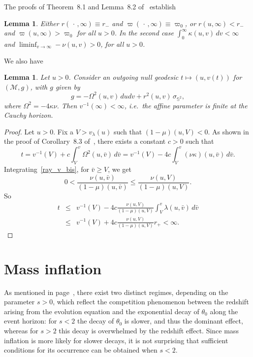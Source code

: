 \documentclass[a4paper,11pt,oneside,reqno]{amsart}
\newcommand{\s}{s}
\newtheorem{Lem}[Thm]{Lemma}
\newcommand{\cal}{\mathcal}
\begin{document}
The proofs of Theorem~8.1 and Lemma~8.2 of~\cite{relIst2} establish
\begin{Lem}\label{rmenos}
Either $r(\,\cdot\,,\infty)\equiv r_-$ and $\varpi(\,\cdot\,,\infty)\equiv \varpi_0$, or
$r(u,\infty)<r_-$ and $\varpi(u,\infty)>\varpi_0$ for all $u>0$. In the second
case $\int_0^\infty\kappa(u,v)\,dv<\infty$ and
$\liminf_{v\to\infty}-\nu(u,v)>0$, for all $u>0$.
\end{Lem}

We also have
\begin{Lem}\label{affine}
Let $u>0$. Consider an outgoing null geodesic $t\mapsto(u,v(t))$ for $({\cal M},g)$, with $g$ given by
$$
g=-\Omega^2(u,v)\,dudv+r^2(u,v)\,\sigma_{{\mathbb S}^2},
$$
where
$\Omega^2=-4\kappa\nu$.
Then $v^{-1}(\infty)<\infty$, i.e.\
the affine parameter is finite at the Cauchy horizon.
\end{Lem}
\begin{proof}
Let $u>0$. Fix a $V>v_\lambda(u)$ such that $(1-\mu)(u,V)<0$.
As shown in the proof of Corollary~8.3 of~\cite{relIst2}, there exists a constant $c>0$
such that
$$
t=v^{-1}(V)+c\int_V^v\Omega^2(u,\bar v)\,d\bar v=v^{-1}(V)-4c\int_V^v(\nu\kappa)(u,\bar v)\,d\bar v.
$$
Integrating~\eqref{ray_v_bis}, for $\bar v\geq V$, we get
$$ 
0<\frac{\nu(u,\bar v)}{(1-\mu)(u,\bar v)}\leq\frac{\nu(u,V)}{(1-\mu)(u,V)}.
$$ 
So
\begin{eqnarray*}
t&\leq& v^{-1}(V)-4c\frac{\nu(u,V)}{(1-\mu)(u,V)}\int_V^v\lambda(u,\bar v)\,d\bar v\\
&\leq& v^{-1}(V)+4c\frac{\nu(u,V)}{(1-\mu)(u,V)}r_+<\infty.
\end{eqnarray*}
\end{proof}

\section{Mass inflation}\label{section9}

As mentioned in page~\pageref{regime}, there exist two distinct regimes, depending on the parameter $\s > 0$, which reflect the competition phenomenon between the redshift arising from the evolution equation and the exponential decay of $\theta_0$ along the event horizon: for $\s < 2$ the decay of $\theta_0$ is slower, and thus the dominant effect, whereas for $\s > 2$ this decay is overwhelmed by the redshift effect. Since mass inflation is more likely for slower decays, it is not surprising that sufficient conditions for its occurrence can be obtained when $\s < 2$.
\end{document}
